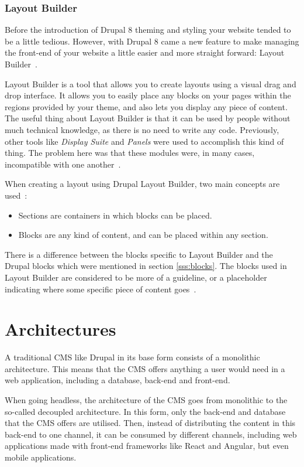 \subsubsection{Layout Builder}
\label{sss:lb}

Before the introduction of Drupal 8 theming and styling your website tended to be a little tedious. However, with Drupal 8 came a new feature to make managing the front-end of your website a little easier and more straight forward: Layout Builder~\autocite{Drupal2021}.

Layout Builder is a tool that allows you to create layouts using a visual drag and drop interface. It allows you to easily place any blocks on your pages within the regions provided by your theme, and also lets you display any piece of content. The useful thing about Layout Builder is that it can be used by people without much technical knowledge, as there is no need to write any code. Previously, other tools like \emph{Display Suite} and \emph{Panels} were used to accomplish this kind of thing. The problem here was that these modules were, in many cases, incompatible with one another~\autocite{Drupalize2022}.

When creating a layout using Drupal Layout Builder, two main concepts are used~\autocite{Drupalize2022}: 
\begin{itemize}
	\item  Sections are containers in which blocks can be placed.
	\item  Blocks are any kind of content, and can be placed within any section.
\end{itemize}
There is a difference between the blocks specific to Layout Builder and the Drupal blocks which were mentioned in section \ref{sss:blocks}. The blocks used in Layout Builder are considered to be more of a guideline, or a placeholder indicating where some specific piece of content goes~\autocite{Drupalize2022}.





\section{Architectures}
A traditional CMS like Drupal in its base form consists of a monolithic architecture. This means that the CMS offers anything a user would need in a web application, including a database, back-end and front-end.

When going headless, the architecture of the CMS goes from monolithic to the so-called decoupled architecture. In this form, only the back-end and database that the CMS offers are utilised. Then, instead of distributing the content in this back-end to one channel, it can be consumed by different channels, including web applications made with front-end frameworks like React and Angular, but even mobile applications.


